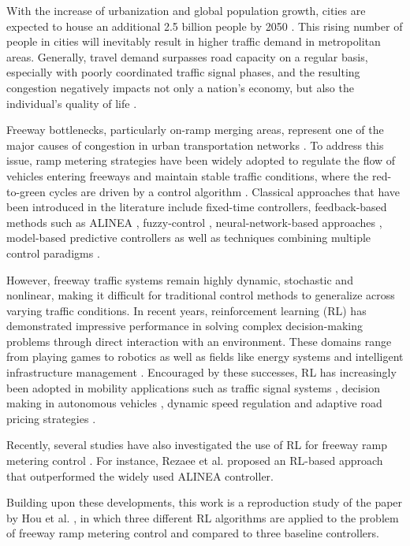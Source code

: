 With the increase of urbanization and global population growth, cities are expected to house an additional 2.5 billion people by 2050 \cite{un2018urbanizationnews}.
This rising number of people in cities will inevitably result in higher traffic demand in metropolitan areas. Generally, travel demand surpasses
road capacity on a regular basis, especially with poorly coordinated traffic signal phases, and the resulting congestion negatively impacts not only a nation's economy, but also the individual's quality of life \cite{chin2002temporary}.

Freeway bottlenecks, particularly on-ramp merging areas, represent one of the major causes of congestion in urban transportation
networks \cite{chin2002temporary}.
To address this issue, ramp metering strategies have been widely adopted to regulate the flow of vehicles entering freeways and maintain stable
traffic conditions, where the red-to-green cycles are driven by a control algorithm \cite{yu2012genetic, ghods2009adaptive}.
Classical approaches that have been introduced in the literature include fixed-time controllers, feedback-based methods such as ALINEA \cite{papageorgiou1997alinea},
fuzzy-control \cite{yu2012genetic, ghods2009adaptive}, neural-network-based approaches \cite{liang2009pid, liang2010single, liang2009feedback, qi2008feedback},
model-based predictive controllers \cite{hegyi2005model} as well as techniques combining multiple control paradigms \cite{feng2011fuzzy}.

However, freeway traffic systems remain highly dynamic, stochastic and nonlinear, making it difficult for traditional control methods to generalize across varying traffic conditions.
In recent years, reinforcement learning (RL) has demonstrated impressive performance in solving complex decision-making problems through direct interaction with an environment.
These domains range from playing games \cite{mnih2013atari, silver2016go, silver2017go} to robotics \cite{kober2013survey, polydoros2017survey} as well as fields like energy systems \cite{xu2019joint, zhang2020restoring}
and intelligent infrastructure management \cite{zhang2021grid, zhang2020edge}.
Encouraged by these successes, RL has increasingly been adopted in mobility applications such as traffic signal systems \cite{eltantawy2010agent, jin2019multi, prashanth2011reinforcement, eltantawy2013multiagent, aslani2017adaptive},
decision making in autonomous vehicles \cite{sallab2017deep, hoel2018automated, chae2017autonomous, ye2019automated, yu2020distributed, zhou2019efficient},
dynamic speed regulation \cite{wu2018differential, wu2019esctc}
and adaptive road pricing strategies \cite{pandey2018multiagent, pandey2020pricing}.

Recently, several studies have also investigated the use of RL for freeway ramp metering control \cite{fares2014freeway, belletti2018expert}. For instance, Rezaee et al. \cite{rezaee2014decentralized} proposed an
RL-based approach that outperformed the widely used ALINEA controller.

Building upon these developments, this work is a reproduction study of the paper by Hou et al. \cite{hou2021rampmeter}, in which three different RL algorithms are applied
to the problem of freeway ramp metering control and compared to three baseline controllers.

